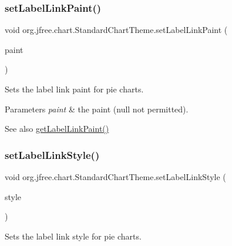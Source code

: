 \subsubsection{\texorpdfstring{set\+Label\+Link\+Paint()}{setLabelLinkPaint()}}
{\footnotesize\ttfamily void org.\+jfree.\+chart.\+Standard\+Chart\+Theme.\+set\+Label\+Link\+Paint (\begin{DoxyParamCaption}\item[{Paint}]{paint }\end{DoxyParamCaption})}

Sets the label link paint for pie charts.


\begin{DoxyParams}{Parameters}
{\em paint} & the paint ({\ttfamily null} not permitted).\\
\hline
\end{DoxyParams}
\begin{DoxySeeAlso}{See also}
\mbox{\hyperlink{classorg_1_1jfree_1_1chart_1_1_standard_chart_theme_a0e4aeb2f6b194d7a09d2fbcaa222eb8a}{get\+Label\+Link\+Paint()}} 
\end{DoxySeeAlso}
\mbox{\label{classorg_1_1jfree_1_1chart_1_1_standard_chart_theme_aec49f0c54df7d3c6a9b6e3efc2a01b6a}} 
\subsubsection{\texorpdfstring{set\+Label\+Link\+Style()}{setLabelLinkStyle()}}
{\footnotesize\ttfamily void org.\+jfree.\+chart.\+Standard\+Chart\+Theme.\+set\+Label\+Link\+Style (\begin{DoxyParamCaption}\item[{\mbox{\hyperlink{classorg_1_1jfree_1_1chart_1_1plot_1_1_pie_label_link_style}{Pie\+Label\+Link\+Style}}}]{style }\end{DoxyParamCaption})}

Sets the label link style for pie charts.


